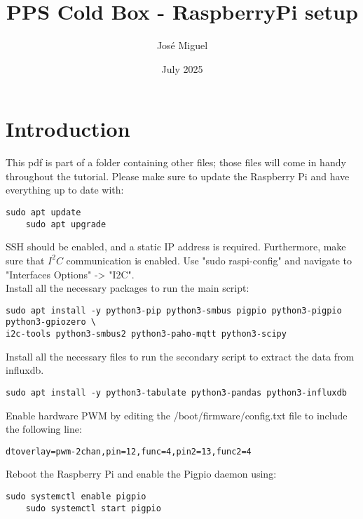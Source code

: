 \documentclass[onecolumn]{article}
\title{
    PPS Cold Box - RaspberryPi setup\\
   
}
\author{
José Miguel\\
}
\date{July 2025}
\begin{document}
\maketitle

\tableofcontents

\newpage
\normalsize




\section{Introduction}
    This pdf is part of a folder containing other files; those files will come in handy throughout the tutorial. Please make sure to update the Raspberry Pi and have everything up to date with:
    

\begin{lstlisting}[numbers=none]
    sudo apt update
    sudo apt upgrade
\end{lstlisting}

    SSH should be enabled, and a static IP address is required. Furthermore, make sure that $I^2C$ communication is enabled. Use "sudo raspi-config" and navigate to "Interfaces Options" -> "I2C". \\

    Install all the necessary packages to run the main script:

\begin{lstlisting}[numbers=none]
sudo apt install -y python3-pip python3-smbus pigpio python3-pigpio python3-gpiozero \
i2c-tools python3-smbus2 python3-paho-mqtt python3-scipy
\end{lstlisting}

    Install all the necessary files to run the secondary script to extract the data from influxdb.

\begin{lstlisting}[numbers=none]
    sudo apt install -y python3-tabulate python3-pandas python3-influxdb
\end{lstlisting}

    Enable hardware PWM by editing the /boot/firmware/config.txt file to include the following line:
    
\begin{lstlisting}[numbers=none]
dtoverlay=pwm-2chan,pin=12,func=4,pin2=13,func2=4
\end{lstlisting}

    Reboot the Raspberry Pi and enable the Pigpio daemon using:

\begin{lstlisting}[numbers=none]
    sudo systemctl enable pigpio
    sudo systemctl start pigpio
\end{lstlisting}
    
\end{document}
